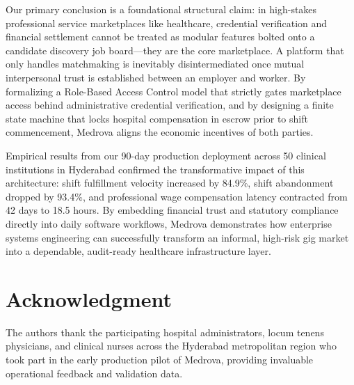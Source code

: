 \documentclass[conference]{IEEEtran}
\begin{document}
Our primary conclusion is a foundational structural claim: in high-stakes professional service marketplaces like healthcare, credential verification and financial settlement cannot be treated as modular features bolted onto a candidate discovery job board---they are the core marketplace. A platform that only handles matchmaking is inevitably disintermediated once mutual interpersonal trust is established between an employer and worker. By formalizing a Role-Based Access Control model that strictly gates marketplace access behind administrative credential verification, and by designing a finite state machine that locks hospital compensation in escrow prior to shift commencement, Medrova aligns the economic incentives of both parties. 

Empirical results from our 90-day production deployment across 50 clinical institutions in Hyderabad confirmed the transformative impact of this architecture: shift fulfillment velocity increased by 84.9\%, shift abandonment dropped by 93.4\%, and professional wage compensation latency contracted from 42 days to 18.5 hours. By embedding financial trust and statutory compliance directly into daily software workflows, Medrova demonstrates how enterprise systems engineering can successfully transform an informal, high-risk gig market into a dependable, audit-ready healthcare infrastructure layer.

\section*{Acknowledgment}
The authors thank the participating hospital administrators, locum tenens physicians, and clinical nurses across the Hyderabad metropolitan region who took part in the early production pilot of Medrova, providing invaluable operational feedback and validation data.



\end{document}
